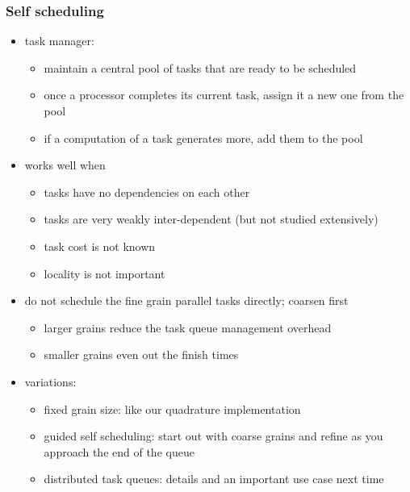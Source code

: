 \begin{frame}[fragile]
%
  \frametitle{Self scheduling}
%
  \begin{itemize}
%
  \item task manager:
    \begin{itemize}
    \item maintain a central pool of tasks that are ready to be scheduled
    \item once a processor completes its current task, assign it a new one from the pool
    \item if a computation of a task generates more, add them to the pool
    \end{itemize}
%
  \item works well when
    \begin{itemize}
    \item tasks have no dependencies on each other
    \item tasks are very weakly inter-dependent (but not studied extensively)
    \item task cost is not known
    \item locality is not important
    \end{itemize}
%
  \item do not schedule the fine grain parallel tasks directly; coarsen first
    \begin{itemize}
    \item larger grains reduce the task queue management overhead
    \item smaller grains even out the finish times
    \end{itemize}
%
  \item variations:
    \begin{itemize}
    \item fixed grain size: like our quadrature implementation
    \item guided self scheduling: start out with coarse grains and refine as you approach the
      end of the queue
    \item distributed task queues: details and an important use case next time 
    \end{itemize}
%
  \end{itemize}
%
\end{frame}

